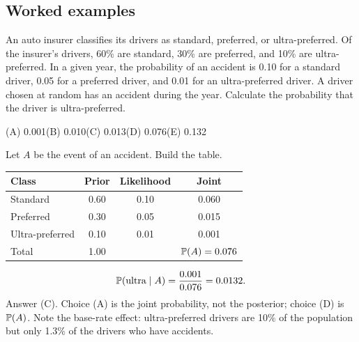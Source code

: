 \subsection{Worked examples}

\begin{example}
An auto insurer classifies its drivers as standard, preferred, or ultra-preferred. Of the
insurer's drivers, 60\% are standard, 30\% are preferred, and 10\% are ultra-preferred. In a
given year, the probability of an accident is 0.10 for a standard driver, 0.05 for a
preferred driver, and 0.01 for an ultra-preferred driver. A driver chosen at random has an
accident during the year. Calculate the probability that the driver is ultra-preferred.
\par\smallskip\noindent (A) 0.001\qquad (B) 0.010\qquad (C) 0.013\qquad (D) 0.076\qquad (E) 0.132
\end{example}
\begin{solution}
Let $A$ be the event of an accident. Build the table.
\begin{center}
\begin{tabular}{@{}lccc@{}}
\toprule
Class & Prior & Likelihood & Joint \\
\midrule
Standard        & 0.60 & 0.10 & 0.060 \\
Preferred       & 0.30 & 0.05 & 0.015 \\
Ultra-preferred & 0.10 & 0.01 & 0.001 \\
\midrule
Total           & 1.00 &      & $\mathbb{P}(A) = 0.076$ \\
\bottomrule
\end{tabular}
\end{center}
\[
\mathbb{P}(\text{ultra} \mid A) = \frac{0.001}{0.076} = 0.0132.
\]
Answer (C). Choice (A) is the joint probability, not the posterior; choice (D) is $\mathbb{P}(A)$.
Note the base-rate effect: ultra-preferred drivers are 10\% of the population but only 1.3\%
of the drivers who have accidents.
\end{solution}

